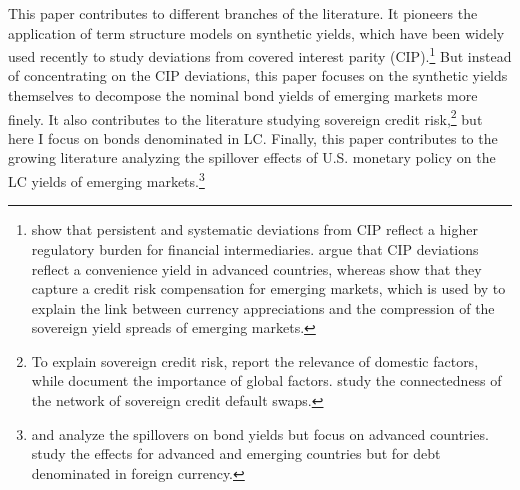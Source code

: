 {This paper contributes to different branches of the literature. 
It pioneers the application of term structure models on synthetic yields, which
have been widely used recently to study deviations from covered interest parity (CIP).\footnote{ \cite{DuTepperVerdelhan:2018} show that persistent and systematic deviations from CIP reflect a higher regulatory burden for financial intermediaries. \cite{DuImSchreger:2018JIE} argue that CIP deviations reflect a convenience yield in advanced countries, whereas \cite{DuSchreger:2016JoF} show that they capture a credit risk compensation for emerging markets, which is used by \cite{HofmannShimShin:2019} to explain the link between currency appreciations and the compression of the sovereign yield spreads of emerging markets.}
But instead of concentrating on the CIP deviations, this paper focuses on the synthetic yields themselves to decompose the nominal bond yields of emerging markets more finely.
It also contributes to the literature studying sovereign credit risk,\footnote{ To explain sovereign credit risk, \cite{HilscherNosbusch:2010} report the relevance of domestic factors, while \cite{Longstaffetal:2011} document the importance of global factors. \cite{BostanciYilmaz:2020} study the connectedness of the network of sovereign credit default swaps.}
but here I focus on bonds denominated in LC.
Finally, this paper contributes to the growing literature analyzing the spillover effects of U.S. monetary policy on the LC yields of emerging markets.\footnote{\cite{RogersScottiWright:2014} and \cite{RogersScottiWright:2018} analyze the spillovers on bond yields but focus on advanced countries. \cite{GilchristYueZakrajsek:2019} study the effects for advanced and emerging countries but for debt denominated in foreign currency.}
}
